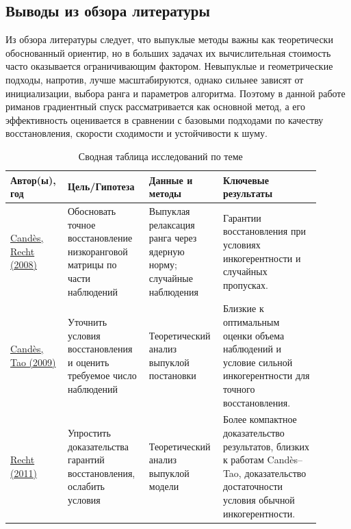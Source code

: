 \documentclass[a4paper,12pt]{article}
\begin{document}
\subsection{Выводы из обзора литературы}

Из обзора литературы следует, что выпуклые методы важны как теоретически обоснованный ориентир, но в больших задачах их вычислительная стоимость часто оказывается ограничивающим фактором. Невыпуклые и геометрические подходы, напротив, лучше масштабируются, однако сильнее зависят от инициализации, выбора ранга и параметров алгоритма. Поэтому в данной работе риманов градиентный спуск рассматривается как основной метод, а его эффективность оценивается в сравнении с базовыми подходами по качеству восстановления, скорости сходимости и устойчивости к шуму.


\begin{table}[H]
    \centering
    \caption{Сводная таблица исследований по теме}
    \label{tab:literature}
    \begin{tabular}{p{0.15\linewidth}p{0.25\linewidth}p{0.2\linewidth}p{0.3\linewidth}}
        \toprule
        \textbf{Автор(ы), год}                                                                                       & \textbf{Цель/Гипотеза}                                                     & \textbf{Данные и методы}                                            & \textbf{Ключевые результаты}                                                                                                                \\
        \midrule
        \href{https://arxiv.org/abs/0805.4471}{Cand\`es, Recht (2008)}                                               & Обосновать точное восстановление низкоранговой матрицы по части наблюдений & Выпуклая релаксация ранга через ядерную норму; случайные наблюдения & Гарантии восстановления при условиях инкогерентности и случайных пропусках.                                                                 \\
        \href{https://arxiv.org/abs/0805.4471}{Cand\`es, Tao (2009)}                                                 & Уточнить условия восстановления и оценить требуемое число наблюдений       & Теоретический анализ выпуклой постановки                            & Близкие к оптимальным оценки объема наблюдений и условие сильной инкогерентности для точного восстановления.                                \\
        \href{https://www.jmlr.org/papers/volume12/recht11a/recht11a.pdf}{Recht (2011)}                              & Упростить доказательства гарантий восстановления, ослабить условия         & Теоретический анализ выпуклой модели                                & Более компактное доказательство результатов, близких к работам Cand\`es--Tao, доказательство достаточности условия обычной инкогерентности. \\

\end{tabular}
\end{table}
\end{document}
